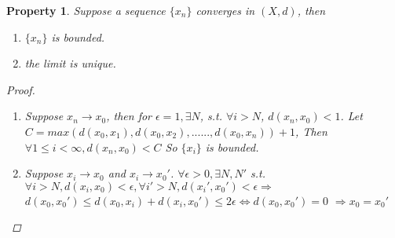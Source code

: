 \documentclass{article}
\newtheorem*{property}{Property}
\begin{document}
\begin{property}
Suppose a sequence $\{x_n\}$ converges in $(X, d)$, then
\begin{enumerate}
    \item $\{x_n\}$ is bounded.
    \item the limit is unique.
\end{enumerate}
\begin{proof} \hfill
    \begin{enumerate}
        \item Suppose $x_n \rightarrow x_0$, then for $\epsilon = 1, \exists N$, 
        s.t. $\forall i > N$, $d(x_n, x_0) < 1$.
        Let $C = max(d(x_0, x_1), d(x_0, x_2),......,d(x_0, x_n)) + 1$,
        Then $\forall 1 \le i < \infty, d(x_n, x_0) < C $
        So $\{x_i\}$ is bounded.
        \item Suppose $x_i \rightarrow x_0$ and $x_i \rightarrow x_0'$.
        $\forall \epsilon > 0, \exists N, N'$ s.t.
        $\forall i > N, d(x_i, x_0) < \epsilon, \forall i' > N, d(x_i', x_0') < \epsilon \Rightarrow$
        $d(x_0, x_0') \le d(x_0, x_i) + d(x_i, x_0') \le 2\epsilon \Leftrightarrow d(x_0, x_0') = 0$
        $\Rightarrow x_0 = x_0'$
    \end{enumerate}
\end{proof}
\end{property}
\end{document}
